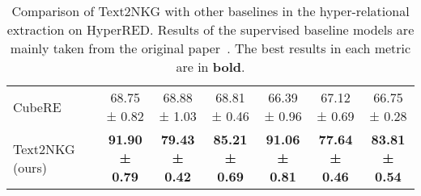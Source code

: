 \documentclass{article} \usepackage{iclr2024_conference,times}
\begin{document}
\begin{table*}[t]
{\begin{tabular}{lcccc|ccc}
CubeRE                                              &                                                   & 68.75 ± 0.82          & 68.88  ± 1.03         & \multicolumn{1}{c|}{68.81 ± 0.46}          & 66.39 ± 0.96           & 67.12 ± 0.69          & 66.75 ± 0.28          \\
Text2NKG (ours)                                     &                                                   & \textbf{91.90 ± 0.79} & \textbf{79.43 ± 0.42} & \multicolumn{1}{c|}{\textbf{85.21 ± 0.69}} & \textbf{91.06 ± 0.81}  & \textbf{77.64 ± 0.46} & \textbf{83.81 ± 0.54} \\
\bottomrule
\end{tabular}
}
\caption{\label{t4}
Comparison of Text2NKG with other baselines in the hyper-relational extraction on HyperRED. Results of the supervised baseline models are mainly taken from the original paper~\citep{HyperRED}. The best results in each metric are in \textbf{bold}. 
}
\end{table*}
\end{document}
